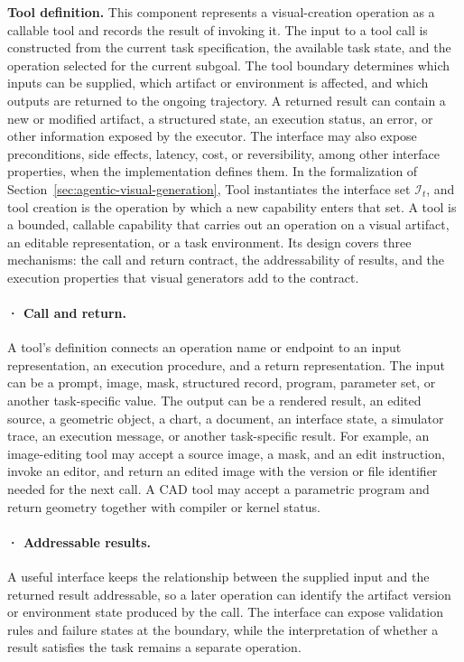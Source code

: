 \textbf{Tool definition.} This component represents a visual-creation operation as a callable tool and records the result of invoking it. The input to a tool call is constructed from the current task specification, the available task state, and the operation selected for the current subgoal. The tool boundary determines which inputs can be supplied, which artifact or environment is affected, and which outputs are returned to the ongoing trajectory. A returned result can contain a new or modified artifact, a structured state, an execution status, an error, or other information exposed by the executor. The interface may also expose preconditions, side effects, latency, cost, or reversibility, among other interface properties, when the implementation defines them. In the formalization of Section~\ref{sec:agentic-visual-generation}, Tool instantiates the interface set $\mathcal{I}_t$, and tool creation is the operation by which a new capability enters that set. A tool is a bounded, callable capability that carries out an operation on a visual artifact, an editable representation, or a task environment. Its design covers three mechanisms: the call and return contract, the addressability of results, and the execution properties that visual generators add to the contract.

\paragraph{· Call and return.} A tool's definition connects an operation name or endpoint to an input representation, an execution procedure, and a return representation. The input can be a prompt, image, mask, structured record, program, parameter set, or another task-specific value. The output can be a rendered result, an edited source, a geometric object, a chart, a document, an interface state, a simulator trace, an execution message, or another task-specific result. For example, an image-editing tool may accept a source image, a mask, and an edit instruction, invoke an editor, and return an edited image with the version or file identifier needed for the next call. A CAD tool may accept a parametric program and return geometry together with compiler or kernel status.

\paragraph{· Addressable results.} A useful interface keeps the relationship between the supplied input and the returned result addressable, so a later operation can identify the artifact version or environment state produced by the call. The interface can expose validation rules and failure states at the boundary, while the interpretation of whether a result satisfies the task remains a separate operation.

